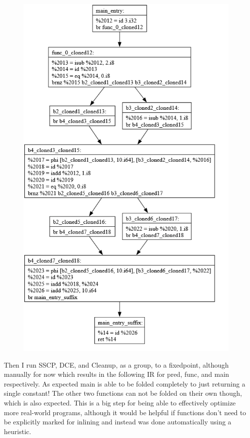 \documentclass[11pt, a4paper, titlepage]{article}
\begin{document}
\begin{figure}[H]
  \includegraphics[scale=0.3]{images/i44.png}
\end{figure}

Then I run SSCP, DCE, and Cleanup, as a group, to a fixedpoint, although manually for now which results in the following IR for pred, func, and main respectively. As expected main is able to be folded completely to just returning a single constant! The other two functions can not be folded on their own though, which is also expected. This is a big step for being able to effectively optimize more real-world programs, although it would be helpful if functions don't need to be explicitly marked for inlining and instead was done automatically using a heuristic.
\end{document}
